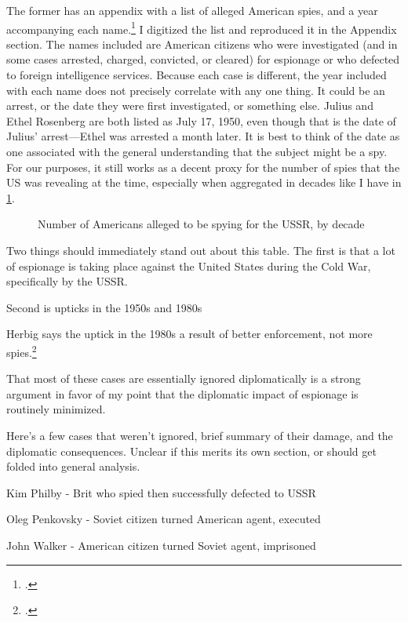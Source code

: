 \documentclass{report}
\begin{document}
\begin{refsegment}
The former has an appendix with a list of alleged American spies, and a year accompanying each name.\footcite[p.~173]{mickolus_counterintelligence_2015} I digitized the list and reproduced it in the Appendix section. The names included are American citizens who were investigated (and in some cases arrested, charged, convicted, or cleared) for espionage or who defected to foreign intelligence services. Because each case is different, the year included with each name does not precisely correlate with any one thing. It could be an arrest, or the date they were first investigated, or something else. Julius and Ethel Rosenberg are both listed as July 17, 1950, even though that is the date of Julius' arrest---Ethel was arrested a month later. It is best to think of the date as one associated with the general understanding that the subject might be a spy. For our purposes, it still works as a decent proxy for the number of spies that the US was revealing at the time, especially when aggregated in decades like I have in \ref{decade_spies}.

\begin{figure}[ht]
  \centering
  
  \label{decade_spies}
  \caption{Number of Americans alleged to be spying for the USSR, by decade}
\end{figure}

Two things should immediately stand out about this table.
The first is that a lot of espionage is taking place against the United States during the Cold War, specifically by the USSR.

Second is upticks in the 1950s and 1980s

Herbig says the uptick in the 1980s a result of better enforcement, not more spies.\footcite{herbig_espionage_2002}

That most of these cases are essentially ignored diplomatically is a strong argument in favor of my point that the diplomatic impact of espionage is routinely minimized.

Here's a few cases that weren't ignored, brief summary of their damage, and the diplomatic consequences. Unclear if this merits its own section, or should get folded into general analysis.

Kim Philby - Brit who spied then successfully defected to USSR

Oleg Penkovsky - Soviet citizen turned American agent, executed

John Walker - American citizen turned Soviet agent, imprisoned


\end{refsegment}
\end{document}
